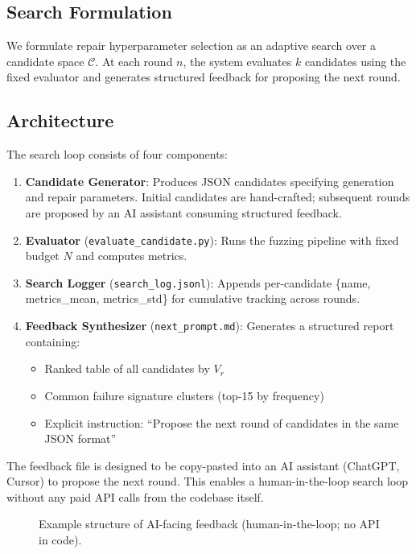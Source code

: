 \documentclass[conference]{IEEEtran}
\begin{document}
\subsection{Search Formulation}

We formulate repair hyperparameter selection as an adaptive search over a candidate space $\mathcal{C}$. At each round $n$, the system evaluates $k$ candidates using the fixed evaluator and generates structured feedback for proposing the next round.

\subsection{Architecture}

The search loop consists of four components:

\begin{enumerate}
    \item \textbf{Candidate Generator}: Produces JSON candidates specifying generation and repair parameters. Initial candidates are hand-crafted; subsequent rounds are proposed by an AI assistant consuming structured feedback.
    \item \textbf{Evaluator} (\texttt{evaluate\_candidate.py}): Runs the fuzzing pipeline with fixed budget $N$ and computes metrics.
    \item \textbf{Search Logger} (\texttt{search\_log.jsonl}): Appends per-candidate \{name, metrics\_mean, metrics\_std\} for cumulative tracking across rounds.
    \item \textbf{Feedback Synthesizer} (\texttt{next\_prompt.md}): Generates a structured report containing:
    \begin{itemize}
        \item Ranked table of all candidates by $V_r$
        \item Common failure signature clusters (top-15 by frequency)
        \item Explicit instruction: ``Propose the next round of candidates in the same JSON format''
    \end{itemize}
\end{enumerate}

The feedback file is designed to be copy-pasted into an AI assistant (ChatGPT, Cursor) to propose the next round. This enables a human-in-the-loop search loop without any paid API calls from the codebase itself.

\begin{figure}[h]
\centering
{}
\caption{Example structure of AI-facing feedback (human-in-the-loop; no API in code).}
\label{fig:feedback}
\end{figure}
\end{document}
